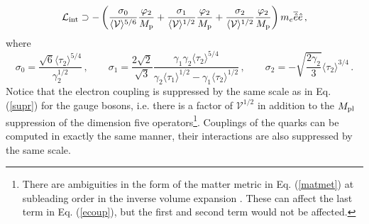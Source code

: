 \documentclass[11pt,a4paper]{article}
\newcommand{\V}{\mathcal{V}}
\def\pref#1{(\ref{#1})}
\begin{document}
\begin{equation}
\label{ecoup}
\mathcal{L}_{\rm int} \supset - \left(\frac{\sigma_0}{\langle \V \rangle^{5/6}} \frac{\varphi_2}{M_{\rm p}} + \frac{\sigma_1}{\langle \V \rangle^{1/2}} \frac{\varphi_2}{M_{\rm p}} + \frac{\sigma_2}{\langle \V \rangle^{1/2}} \frac{\varphi_2}{M_{\rm p}} \right) m_e \overline{\hat{e}} \hat{e} \,,
\end{equation}
where
%
\begin{equation}
\sigma_0 = \frac{\sqrt{6} \langle \tau_2 \rangle^{5/4}}{\gamma_2^{1/2}} \,, \qquad \sigma_1= \frac{2 \sqrt{2}}{\sqrt{3}}\frac{\gamma_1 \gamma_2 \langle \tau_2 \rangle^{5/4}}{\gamma_2 \langle \tau_1 \rangle^{1/2} - \gamma_1 \langle \tau_2 \rangle^{1/2}} \,, \qquad \sigma_2 = - \sqrt{\frac{2 \gamma_2}{3}} \langle \tau_2 \rangle^{3/4} \,.
\end{equation}
%
Notice that the electron coupling is suppressed by the same scale as in Eq. \pref{supr} for the gauge bosons, i.e. there is a factor of $\V^{1/2}$ in addition to the $M_{\rm pl}$ suppression of the dimension five operators\footnote{There are ambiguities in the form of the matter metric in Eq. \pref{matmet} at subleading order in the inverse volume expansion \cite{Blumenhagen:2009gk, Conlon:2011jq}. These can affect the last term in Eq. \pref{ecoup}, but the first and second term would not be affected.}. Couplings of the quarks can be computed in exactly the same manner, their interactions are also suppressed by the same scale.
\end{document}
